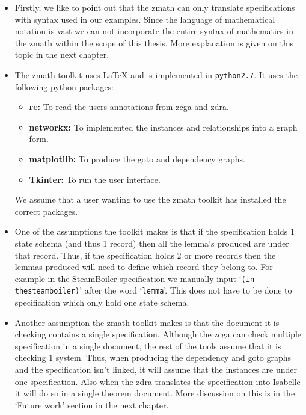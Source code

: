 \begin{itemize}
\item Firstly, we like to point out that the \gls{zmath} can only translate
specifications with syntax used in our examples. Since the language of
mathematical notation is vast we can not incorporate the entire syntax of
mathematics in the \gls{zmath} within the scope of this thesis. More explanation
is given on this topic in the next chapter.

\item The \gls{zmath} toolkit uses \LaTeX{} and is implemented in 
\verb|python2.7|. It uses the following python packages:
\begin{itemize}
\item \textbf{re:} To read the users annotations from \gls{zcga} and \gls{zdra}.
\item \textbf{networkx:} To implemented the instances and relationships into a
graph form.
\item \textbf{matplotlib:} To produce the goto and dependency graphs.
\item \textbf{Tkinter:} To run the user interface.
\end{itemize}

We assume that a user wanting to use the \gls{zmath} toolkit has installed the
correct packages.

\item One of the assumptions the toolkit makes is that if the specification
holds 1 state schema (and thus 1 record) then all the lemma's produced are under
that record. Thus, if the specification holds 2 or more records then the lemmas
produced will need to define which record they belong to. For example in the
SteamBoiler specification we manually input `\verb|(in thesteamboiler)|' after
the word `\verb|lemma|'. This does not have to be done to specification which
only hold one state schema.

\item Another assumption the \gls{zmath} toolkit makes is that the document it is
checking contains a single specification. Although the \gls{zcga} can check
multiple specification in a single document, the rest of the tools assume that
it is checking 1 system. Thus, when producing the dependency and goto graphs and
the specification isn't linked, it will assume that the instances are under one
specification. Also when the \gls{zdra} translates the specification into
Isabelle it will do so in a single theorem document. More discussion on this is
in the `Future work' section in the next chapter.


\end{itemize}
